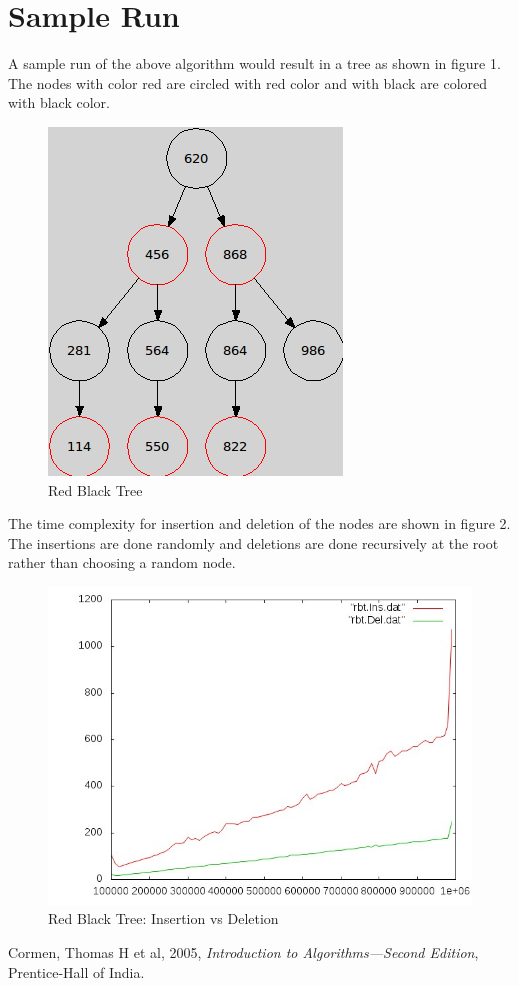 \documentclass[11pt, oneside, a4paper]{article}
\begin{document}
\section{Sample Run}
A sample run of the above algorithm would result in a tree as shown in figure 1.  The nodes with color red are circled with red color and with black are colored with black color.
\begin{figure}[htb]
\begin{center}
\ifpdf
	\includegraphics[scale=0.70]{./rbt.png}
\else
\fi
\caption{Red Black Tree}
\label{fig:1}
\end{center}
\end{figure}

The time complexity for insertion and deletion of the nodes are shown in figure 2.  The insertions are done randomly and deletions are done recursively at the root rather than choosing a random node.
\begin{figure}[htb]
\begin{center}
\ifpdf
	\includegraphics[scale=0.70]{./rbt.jpeg}
\else
\fi
\caption{Red Black Tree: Insertion vs Deletion}
\label{fig:2}
\end{center}
\end{figure}

\newpage 
\begin{thebibliography}{10}
\bibitem{} Cormen, Thomas H et al, 2005, \emph{Introduction to Algorithms---Second Edition}, Prentice-Hall of India.
\end{thebibliography}
\end{document}

